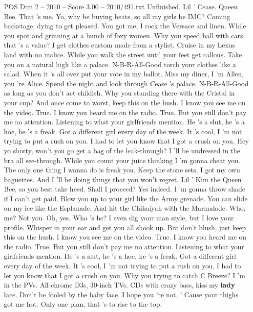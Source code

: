 \begin{textsample}{POS Dim 2 – 2010 – Score 3.00 – 2010/491.txt}  \label{ex:f2_pos_032}
Unfinished.
Lil ' Cease.
Queen Bee.
That 's me.
Yo, why be buying beats, so all my girls be IMC?
Coming backstage, dying to get pleased.
You got me, I rock the Versace and linen.
While you spot and grinning at a bunch of foxy women.
Why you speed ball with cars that 's a value?
I get clothes custom made from a stylist.
Cruise in my Lexus land with no malice.
While you walk the street until your feet get callous.
Take you on a natural high like a palace.
N-B-R-All-Good torch your clothes like a salad.
When it 's all over put your vote in my ballot.
Miss my diner, I 'm Allen, you 're Alice.
Spend the night and look through Cease 's palace.
N-B-R-All-Good as long as you don't act childish.
Why you standing there with the Cristal in your cup?
And once come to worst, keep this on the hush.
I know you see me on the video.
True.
I know you heard me on the radio.
True.
But you still don't pay me no attention.
Listening to what your girlfriends mention.
He 's a slut, he 's a hoe, he 's a freak.
Got a different girl every day of the week.
It 's cool, I 'm not trying to put a rush on you.
I had to let you know that I got a crush on you.
Hey yo shorty, won't you go get a bag of the leak-through?
I 'll be undressed in the bra all see-through.
While you count your juice thinking I 'm gonna cheat you.
The only one thing I wanna do is freak you.
Keep the stone sets, I got my own baguettes.
And I 'll be doing things that you won't regret.
Lil ' Kim the Queen Bee, so you best take heed.
Shall I proceed?
Yes indeed.
I 'm gonna throw shade if I can't get paid.
Blow you up to your girl like the Army grenade.
You can slide on my ice like the Esplanade.
And hit the Chihaiyah with the Marmalade.
Who, me?
Not you.
Oh, yes.
Who 's he?
I even dig your man style, but I love your profile.
Whisper in your ear and get you all shook up.
But don't blush, just keep this on the hush.
I know you see me on the video.
True.
I know you heard me on the radio.
True.
But you still don't pay me no attention.
Listening to what your girlfriends mention.
He 's a slut, he 's a hoe, he 's a freak.
Got a different girl every day of the week.
It 's cool, I 'm not trying to put a rush on you.
I had to let you know that I got a crush on you.
Why you trying to catch C Breeze?
I 'm in the PVs.
All chrome D3s, 30-inch TVs.
CDs with crazy bass, kiss my \textbf{lady} lace.
Don't be fooled by the baby face, I hope you 're not. ' Cause your thighs got me hot.
Only one plan, that 's to rise to the top.

\end{textsample}
